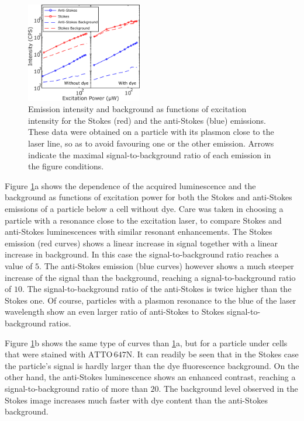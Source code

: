 \documentclass[journal=nalefd,manuscript=letter]{achemso}
\newcommand{\atto}{\ensuremath{\textrm{ATTO}\,647\textrm{N}}}
\begin{document}
\begin{figure}[htp]
\centering
	\includegraphics[width=0.45\textwidth]{Figures/06_Power_Intensity/power_intensity.png}
	\caption{Emission intensity and background as functions of excitation intensity for the
	Stokes (red) and the anti-Stokes (blue)
	emissions. These data were obtained on a particle with its plasmon close to the laser line, so as to
	avoid favouring one or the other emission. Arrows indicate the maximal signal-to-background ratio of each emission in the figure conditions. }
	\label{fig:power_intensity}
\end{figure}

Figure \ref{fig:power_intensity}a shows the dependence of the acquired
luminescence and the background as functions of excitation power for both the
Stokes and anti-Stokes emissions of a particle below a cell without dye. Care
was taken in choosing a particle with a resonance close to the excitation laser,
to compare Stokes and anti-Stokes luminescences with similar resonant enhancements. The Stokes
emission (red curves) shows a linear increase in signal together with a linear
increase in background. In this case the signal-to-background ratio reaches a
value of $5$. The anti-Stokes emission (blue curves) however shows a much
steeper increase of the signal than the background, reaching a
signal-to-background ratio of $10$. The signal-to-background ratio of the
anti-Stokes is twice higher than the Stokes one. Of course, particles with a plasmon
resonance to the blue of the laser wavelength show an even larger ratio of anti-Stokes to Stokes signal-to-background ratios.

Figure \ref{fig:power_intensity}b shows the same type of curves than
\ref{fig:power_intensity}a, but for a particle under cells that were stained
with \atto. It can readily be seen that in the Stokes case the particle's signal is hardly larger than the dye fluorescence background. On the other hand, the
anti-Stokes luminescence shows an enhanced contrast, reaching a
signal-to-background ratio of more than $20$. The background level observed in the Stokes image increases much faster with dye content than the
anti-Stokes background. 
\end{document}
